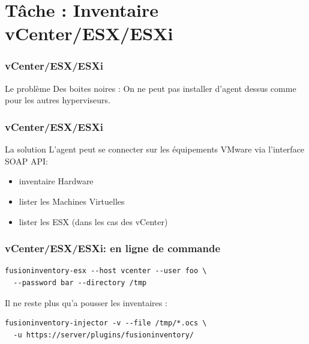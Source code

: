\documentclass{beamer}
\begin{document}
\section{Tâche : Inventaire vCenter/ESX/ESXi}


\begin{frame}
    \frametitle{vCenter/ESX/ESXi}

    \begin{block}{Le problème}
    Des boites noires : On ne peut pas installer d'agent dessus comme pour les autres hyperviseurs.
    \end{block}


\end{frame}

\begin{frame}
    \frametitle{vCenter/ESX/ESXi}

    \begin{block}{La solution}
    L'agent peut se connecter sur les équipements VMware via l'interface SOAP API:
        \begin{itemize}
                \item inventaire Hardware
                \item lister les Machines Virtuelles
                \item lister les ESX (dans les cas des vCenter)
        \end{itemize}
    \end{block}

\end{frame}

\begin{frame}[fragile]
    \frametitle{vCenter/ESX/ESXi: en ligne de commande}

\begin{lstlisting}
fusioninventory-esx --host vcenter --user foo \ 
  --password bar --directory /tmp
\end{lstlisting}

Il ne reste plus qu'a pousser les inventaires :
\begin{lstlisting}
fusioninventory-injector -v --file /tmp/*.ocs \ 
  -u https://server/plugins/fusioninventory/
\end{lstlisting}

\end{frame}
\end{document}
